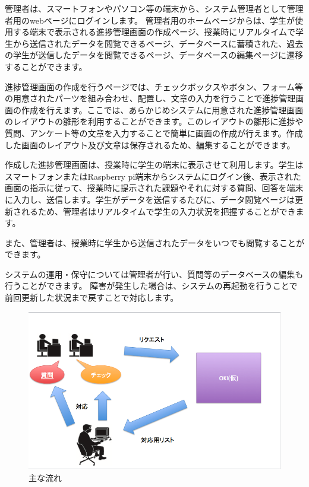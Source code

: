 \documentclass[a4j,titlepage]{ujarticle}
\begin{document}
管理者は、スマートフォンやパソコン等の端末から、システム管理者として管理者用のwebページにログインします。
管理者用のホームページからは、学生が使用する端末で表示される進捗管理画面の作成ページ、授業時にリアルタイムで学生から送信されたデータを閲覧できるページ、データベースに蓄積された、過去の学生が送信したデータを閲覧できるページ、データベースの編集ページに遷移することができます。

進捗管理画面の作成を行うページでは、チェックボックスやボタン、フォーム等の用意されたパーツを組み合わせ、配置し、文章の入力を行うことで進捗管理画面の作成を行えます。ここでは、あらかじめシステムに用意された進捗管理画面のレイアウトの雛形を利用することができます。このレイアウトの雛形に進捗や質問、アンケート等の文章を入力することで簡単に画面の作成が行えます。作成した画面のレイアウト及び文章は保存されるため、編集することができます。

作成した進捗管理画面は、授業時に学生の端末に表示させて利用します。学生はスマートフォンまたはRaspberry pi端末からシステムにログイン後、表示された画面の指示に従って、授業時に提示された課題やそれに対する質問、回答を端末に入力し、送信します。学生がデータを送信するたびに、データ閲覧ページは更新されるため、管理者はリアルタイムで学生の入力状況を把握することができます。

また、管理者は、授業時に学生から送信されたデータをいつでも閲覧することができます。



システムの運用・保守については管理者が行い、質問等のデータベースの編集も行うことができます。
障害が発生した場合は、システムの再起動を行うことで前回更新した状況まで戻すことで対応します。 %
\begin{figure}[h]

\centering
   \includegraphics[width=13cm]{hito.png}
  \caption{主な流れ}
\end{figure}
\end{document}
